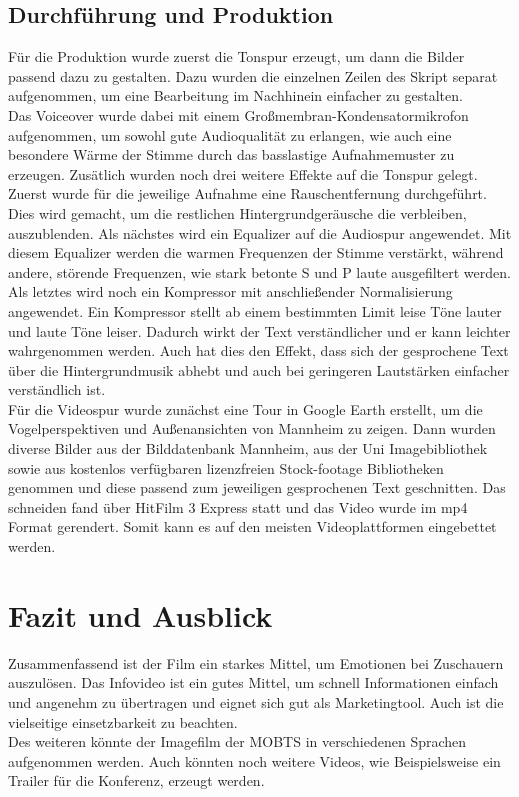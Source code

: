 \subsection{Durchführung und Produktion}
Für die Produktion wurde zuerst die Tonspur erzeugt, um dann die Bilder passend dazu zu gestalten. Dazu wurden die einzelnen Zeilen des Skript separat aufgenommen, um eine Bearbeitung im Nachhinein einfacher zu gestalten.\\
Das Voiceover wurde dabei mit einem Großmembran-Kondensatormikrofon aufgenommen, um sowohl gute Audioqualität zu erlangen, wie auch eine besondere Wärme der Stimme durch das basslastige Aufnahmemuster zu erzeugen. Zusätlich wurden noch drei weitere Effekte auf die Tonspur gelegt. Zuerst wurde für die jeweilige Aufnahme eine Rauschentfernung durchgeführt. Dies wird gemacht, um die restlichen Hintergrundgeräusche die verbleiben, auszublenden. Als nächstes wird ein Equalizer auf die Audiospur angewendet. Mit diesem Equalizer werden die warmen Frequenzen der Stimme verstärkt, während andere, störende Frequenzen, wie stark betonte S und P laute ausgefiltert werden. Als letztes wird noch ein Kompressor mit anschließender Normalisierung angewendet. Ein Kompressor stellt ab einem bestimmten Limit leise Töne lauter und laute Töne leiser. Dadurch wirkt der Text verständlicher und er kann leichter wahrgenommen werden. Auch hat dies den Effekt, dass sich der gesprochene Text über die Hintergrundmusik abhebt und auch bei geringeren Lautstärken einfacher verständlich ist.\\
Für die Videospur wurde zunächst eine Tour in Google Earth erstellt, um die Vogelperspektiven und Außenansichten von Mannheim zu zeigen. Dann wurden diverse Bilder aus der Bilddatenbank Mannheim, aus der Uni Imagebibliothek sowie aus kostenlos verfügbaren lizenzfreien Stock-footage Bibliotheken genommen und diese passend zum jeweiligen gesprochenen Text geschnitten. Das schneiden fand über HitFilm 3 Express statt und das Video wurde im mp4 Format gerendert. Somit kann es auf den meisten Videoplattformen eingebettet werden.
\section{Fazit und Ausblick}
Zusammenfassend ist der Film ein starkes Mittel, um Emotionen bei Zuschauern auszulösen. Das Infovideo ist ein gutes Mittel, um schnell Informationen einfach und angenehm zu übertragen und eignet sich gut als Marketingtool. Auch ist die vielseitige einsetzbarkeit zu beachten.\\
Des weiteren könnte der Imagefilm der \ac{MOBTS} in verschiedenen Sprachen aufgenommen werden. Auch könnten noch weitere Videos, wie Beispielsweise ein Trailer für die Konferenz, erzeugt werden.

